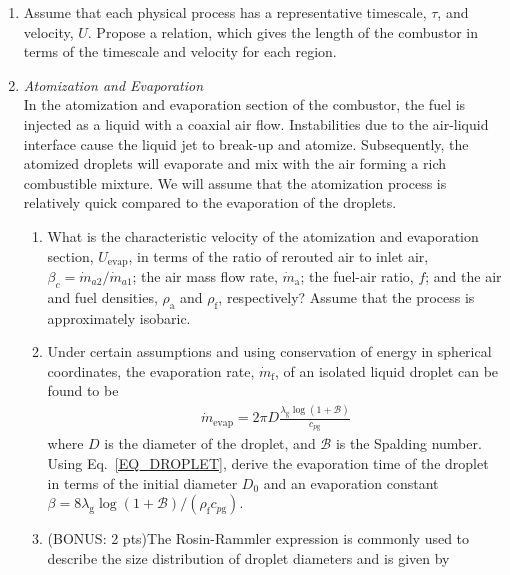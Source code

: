 \documentclass[11pt]{article}
\begin{document}
\begin{enumerate}[label=(\alph*)]
	\item
    	Assume that each physical process has a representative timescale, $\tau$, and velocity, $U$. Propose a relation, which gives the length of the combustor in terms of the timescale and velocity for each region.
    \item \textit{Atomization and Evaporation}\\
    	In the atomization and evaporation section of the combustor, the fuel is injected as a liquid with a coaxial air flow. Instabilities due to the air-liquid interface cause the liquid jet to break-up and atomize. Subsequently, the atomized droplets will evaporate and mix with the air forming a rich combustible mixture. We will assume that the atomization process is relatively quick compared to the evaporation of the droplets.
        \begin{enumerate}[label=(\roman*)]
        	\item
            	What is the characteristic velocity of the atomization and evaporation section, $U_\mathrm{evap}$, in terms of the ratio of rerouted air to inlet air, $\beta_c=\dot{m}_{a2}/\dot{m}_{a1}$; the air mass flow rate, $\dot m_\mathrm{a}$; the fuel-air ratio, $f$; and the air and fuel densities, $\rho_\mathrm{a}$ and $\rho_\mathrm{f}$, respectively? Assume that the process is approximately isobaric. 
            \item 
            	Under certain assumptions and using conservation of energy in spherical coordinates, the evaporation rate, $\dot m _\mathrm{f}$, of an isolated liquid droplet can be found to be
                \begin{equation}
                	\label{EQ_DROPLET}
                	\begin{aligned}
                    	\dot{m}_\mathrm{evap}=2\pi D \frac{\lambda_\mathrm{g}\log(1+\mathcal{B})}{c_{p\mathrm{g}}}
                    \end{aligned}
                \end{equation}
                where $D$ is the diameter of the droplet, and $\mathcal{B}$ is the Spalding number. Using Eq.~\ref{EQ_DROPLET}, derive the evaporation time of the droplet in terms of the initial diameter $D_0$ and an evaporation constant $\beta=8\lambda_\mathrm{g}\log(1+\mathcal{B})/(\rho_\mathrm{f}c_{p\mathrm{g}})$.
        	\item
            	(BONUS: 2 pts)The Rosin-Rammler expression is commonly used to describe the size distribution of droplet diameters and is given by 

\end{enumerate}
\end{enumerate}
\end{document}
